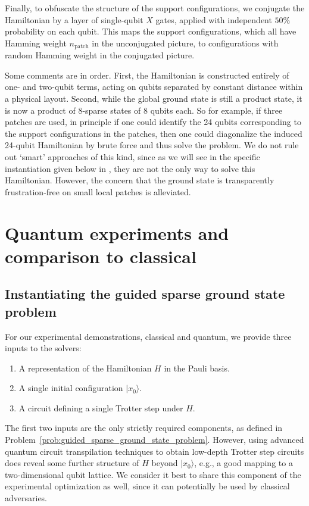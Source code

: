 \documentclass[
  reprint,            %
  amsmath,amssymb,
  aps,
  superscriptaddress, %
  longbibliography
]{revtex4-2}
\theoremstyle{definition}
\begin{document}
Finally, to obfuscate the structure of the support configurations, we conjugate the Hamiltonian by a layer of single-qubit $X$ gates, applied with independent $50\%$ probability on each qubit.
This maps the support configurations, which all have Hamming weight $n_\mathrm{patch}$ in the unconjugated picture, to configurations with random Hamming weight in the conjugated picture.

Some comments are in order.
First, the Hamiltonian is constructed entirely of one- and two-qubit terms, acting on qubits separated by constant distance within a physical layout.
Second, while the global ground state is still a product state, it is now a product of $8$-sparse states of $8$ qubits each.
So for example, if three patches are used, in principle if one could identify the 24 qubits corresponding to the support configurations in the patches, then one could diagonalize the induced 24-qubit Hamiltonian by brute force and thus solve the problem.
We do not rule out `smart' approaches of this kind, since as we will see in the specific instantiation given below in , they are not the only way to solve this Hamiltonian.
However, the concern that the ground state is transparently frustration-free on small local patches is alleviated.



\section{Quantum experiments and comparison to classical}
\label{sec:results}

\subsection{Instantiating the guided sparse ground state problem}
\label{sec:setup}

For our experimental demonstrations, classical and quantum, we provide three inputs to the solvers:
\begin{enumerate}
    \item A representation of the Hamiltonian $H$ in the Pauli basis.
    \item A single initial configuration $|x_0\rangle$.
    \item A circuit defining a single Trotter step under $H$.
\end{enumerate}
The first two inputs are the only strictly required components, as defined in Problem~\ref{prob:guided_sparse_ground_state_problem}.
However, using advanced quantum circuit transpilation techniques to obtain low-depth Trotter step circuits does reveal some further structure of $H$ beyond $|x_0\rangle$, e.g., a good mapping to a two-dimensional qubit lattice.
We consider it best to share this component of the experimental optimization as well, since it can potentially be used by classical adversaries.
\end{document}
